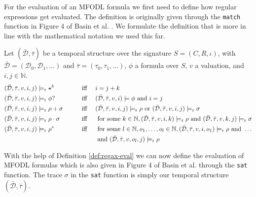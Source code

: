 For the evaluation of an MFODL formula we first need to define how regular expressions get evaluated.
The definition is originally given through the \texttt{match} function in Figure 4 of Basin et al. \cite{Basin2020}.
We formulate the definition that is more in line with the mathematical notation we used this far.
\begin{definition}
    \label{def:regax-eval}
    Let $(\bar{\mathcal{D}}, \bar{\tau})$ be a temporal structure over the signature $S = (C,R,\iota)$, with $\bar{\mathcal{D}} = (\mathcal{D}_0,\mathcal{D}_1,\dots)$ and $\bar{\tau} = (\tau_0, \tau_1, \dots)$, $\phi$ a formula over $S$, $v$ a valuation, and $i,j \in \mathbb{N}$.
    \begin{alignat*}{3}
        &(\bar{\mathcal{D}}, \bar{\tau}, v, i, j) \models_{\text{r}} \star^k
            &&\text{iff } && i = j + k\\
        &(\bar{\mathcal{D}}, \bar{\tau}, v, i, j) \models_{\text{r}} \phi ?
            &&\text{iff } && (\bar{\mathcal{D}}, \bar{\tau}, v, i) \models \phi \text{ and } i = j\\
        &(\bar{\mathcal{D}}, \bar{\tau}, v, i, j) \models_{\text{r}} \rho + \sigma \qquad
            &&\text{iff } && (\bar{\mathcal{D}}, \bar{\tau}, v, i, j) \models_{\text{r}} \rho \text{ or }(\bar{\mathcal{D}}, \bar{\tau}, v, i, j) \models_{\text{r}} \sigma \\
        &(\bar{\mathcal{D}}, \bar{\tau}, v, i, j) \models_{\text{r}} \rho \cdot \sigma \qquad
            &&\text{iff } && \text{ for some } k \in \mathbb{N}, (\bar{\mathcal{D}}, \bar{\tau}, v, i, k) \models_{\text{r}} \rho \text{ and }(\bar{\mathcal{D}}, \bar{\tau}, v, k, j) \models_{\text{r}} \sigma \\
        &(\bar{\mathcal{D}}, \bar{\tau}, v, i, j) \models_{\text{r}} \rho^*
            &&\text{iff } && \text{ for some } l \in \mathbb{N}, o_1,\dots,o_l \in \mathbb{N}, (\bar{\mathcal{D}}, \bar{\tau}, v, i, o_1) \models_{\text{r}} \rho \text{ and } \dots  \\
            &&&&&\text{ and } (\bar{\mathcal{D}}, \bar{\tau}, v, o_l, j) \models_{\text{r}} \rho \\
    \end{alignat*}
    
\end{definition}
With the help of Definition \ref{def:regax-eval} we can now define the evaluation of MFODL formulas which is also given in Figure 4 of Basin et al. \cite{Basin2020} through the \texttt{sat} function.
The trace $\sigma$ in the \texttt{sat} function is simply our temporal structure $(\bar{\mathcal{D}},\bar{\tau})$.
